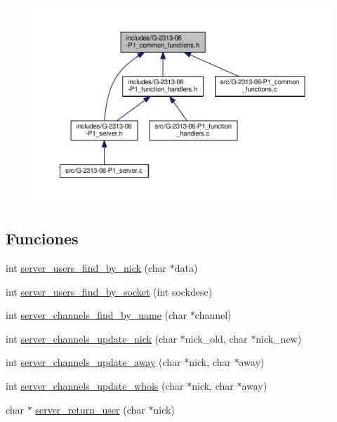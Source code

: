 \begin{figure}[H]
\begin{center}
\leavevmode
\includegraphics[width=350pt]{G-2313-06-P1__common__functions_8h__dep__incl}
\end{center}
\end{figure}
\subsection*{Funciones}
\begin{DoxyCompactItemize}
\item 
int \hyperlink{G-2313-06-P1__common__functions_8h_a61cca6f1a1adeb81f722ecc2ff35aab5}{server\+\_\+users\+\_\+find\+\_\+by\+\_\+nick} (char $\ast$data)
\item 
int \hyperlink{G-2313-06-P1__common__functions_8h_a485e68f66db6ae4b7297d99c32afe30a}{server\+\_\+users\+\_\+find\+\_\+by\+\_\+socket} (int sockdesc)
\item 
int \hyperlink{G-2313-06-P1__common__functions_8h_a875ae5278d95716b494b26f96cf4ae6e}{server\+\_\+channels\+\_\+find\+\_\+by\+\_\+name} (char $\ast$channel)
\item 
int \hyperlink{G-2313-06-P1__common__functions_8h_ae8a282d9cdfc8187b8e74e368bc56d92}{server\+\_\+channels\+\_\+update\+\_\+nick} (char $\ast$nick\+\_\+old, char $\ast$nick\+\_\+new)
\item 
int \hyperlink{G-2313-06-P1__common__functions_8h_af9aeb632d55a4cbbe842ab97001b5128}{server\+\_\+channels\+\_\+update\+\_\+away} (char $\ast$nick, char $\ast$away)
\item 
int \hyperlink{G-2313-06-P1__common__functions_8h_a5c6f52d9a2461877178a1a0905d14ea9}{server\+\_\+channels\+\_\+update\+\_\+whois} (char $\ast$nick, char $\ast$away)
\item 
char $\ast$ \hyperlink{G-2313-06-P1__common__functions_8h_a230bf24ab7ae18d2e81ebc1d3575a6ad}{server\+\_\+return\+\_\+user} (char $\ast$nick)
\end{DoxyCompactItemize}


